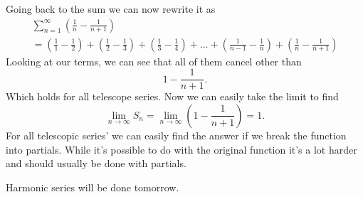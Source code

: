 Going back to the sum we can now rewrite it as
\begin{gather*}
\sum_{ n=1 } ^{ \infty } \left( \frac{ 1 }{ n } -\frac{ 1 }{ n+1 }  \right) \\
=\left( \frac{ 1 }{ 1 } -\frac{ 1 }{ 2 }  \right) +\left( \frac{ 1 }{ 2 } -\frac{ 1 }{ 3 }  \right) +\left( \frac{ 1 }{ 3 } -\frac{ 1 }{ 4 }  \right) +\ldots+\left( \frac{ 1 }{ n-1 } -\frac{ 1 }{ n }  \right)  +\left( \frac{ 1 }{ n } -\frac{ 1 }{ n+1 }  \right) 
\end{gather*}
Looking at our terms, we can see that all of them cancel other than 
\[
1-\frac{ 1 }{ n+1 } 
.\] 
Which holds for all telescope series. Now we can easily take the limit to find 
\[
\lim_{ n \to \infty} S_n = \lim_{ n \to \infty} \left( 1-\frac{ 1 }{ n+1 }  \right) =1
.\] 
For all telescopic series' we can easily find the answer if we break the function into partials. While it's possible to do with the original function it's a lot harder and should usually be done with partials. 

Harmonic series will be done tomorrow. 
